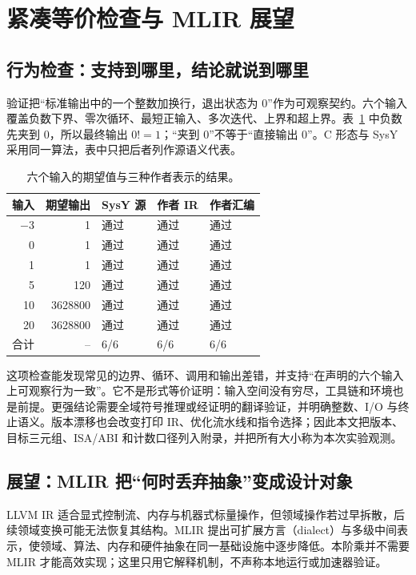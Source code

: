\section{紧凑等价检查与 MLIR 展望}
\label{sec:validation}

\subsection{行为检查：支持到哪里，结论就说到哪里}

验证把“标准输出中的一个整数加换行，退出状态为 0”作为可观察契约。六个输入覆盖负数下界、零次循环、最短正输入、多次迭代、上界和超上界。表~\ref{tab:tests} 中负数先夹到 0，所以最终输出 $0!=1$；“夹到 0”不等于“直接输出 0”。C 形态与 SysY 采用同一算法，表中只把后者列作源语义代表。

\begin{table}[tb]
\caption{六个输入的期望值与三种作者表示的结果。}
\label{tab:tests}
\centering\small
\begin{tabular}{@{}rrlll@{}}
\toprule
输入 & 期望输出 & SysY 源 & 作者 IR & 作者汇编\\
\midrule
$-3$ & 1 & 通过 & 通过 & 通过\\
0 & 1 & 通过 & 通过 & 通过\\
1 & 1 & 通过 & 通过 & 通过\\
5 & 120 & 通过 & 通过 & 通过\\
10 & 3628800 & 通过 & 通过 & 通过\\
20 & 3628800 & 通过 & 通过 & 通过\\
\midrule
合计 & -- & 6/6 & 6/6 & 6/6\\
\bottomrule
\end{tabular}
\end{table}

这项检查能发现常见的边界、循环、调用和输出差错，并支持“在声明的六个输入上可观察行为一致”。它不是形式等价证明：输入空间没有穷尽，工具链和环境也是前提。更强结论需要全域符号推理或经证明的翻译验证，并明确整数、I/O 与终止语义。版本漂移也会改变打印 IR、优化流水线和指令选择；因此本文把版本、目标三元组、ISA/ABI 和计数口径列入附录，并把所有大小称为本次实验观测。

\subsection{展望：MLIR 把“何时丢弃抽象”变成设计对象}

LLVM IR 适合显式控制流、内存与机器式标量操作，但领域操作若过早拆散，后续领域变换可能无法恢复其结构。MLIR 提出可扩展方言（dialect）与多级中间表示，使领域、算法、内存和硬件抽象在同一基础设施中逐步降低\cite{lattner-et-al-mlir-2021}。本阶乘并不需要 MLIR 才能高效实现；这里只用它解释机制，不声称本地运行或加速器验证。

